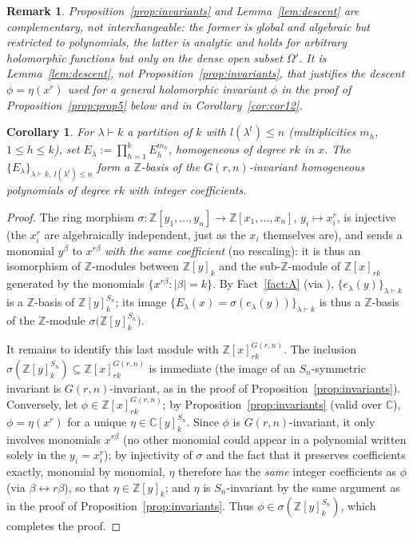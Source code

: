 \documentclass[10pt,a4paper]{amsart}
\newtheorem{corollary}[theorem]{Corollary}
\newtheorem{remark}[theorem]{Remark}
\newcommand{\CC}{\mathbb{C}}
\newcommand{\ZZ}{\mathbb{Z}}
\begin{document}
\begin{remark}
Proposition~\ref{prop:invariants} and Lemma~\ref{lem:descent} are complementary, not interchangeable: the former is global and algebraic but restricted to polynomials, the latter is analytic and holds for arbitrary holomorphic functions but only on the dense open subset $\Omega'$. It is Lemma~\ref{lem:descent}, not Proposition~\ref{prop:invariants}, that justifies the descent $\phi=\eta(x^r)$ used for a general holomorphic invariant $\phi$ in the proof of Proposition~\ref{prop:prop5} below and in Corollary~\ref{cor:cor12}.
\end{remark}

\begin{corollary}\label{cor:base}
For $\lambda\vdash k$ a partition of $k$ with $l(\lambda^t)\le n$ (multiplicities $m_h$, $1\le h\le k$), set $E_\lambda:=\prod_{h=1}^k E_h^{m_h}$, homogeneous of degree $rk$ in $x$. The $\{E_\lambda\}_{\lambda\vdash k,\ l(\lambda^t)\le n}$ form a $\ZZ$-basis of the $G(r,n)$-invariant homogeneous polynomials of degree $rk$ with integer coefficients.
\end{corollary}

\begin{proof}
The ring morphism $\sigma:\ZZ[y_1,\dots,y_n]\to\ZZ[x_1,\dots,x_n]$, $y_i\mapsto x_i^r$, is injective (the $x_i^r$ are algebraically independent, just as the $x_i$ themselves are), and sends a monomial $y^\beta$ to $x^{r\beta}$ \emph{with the same coefficient} (no rescaling): it is thus an isomorphism of $\ZZ$-modules between $\ZZ[y]_k$ and the sub-$\ZZ$-module of $\ZZ[x]_{rk}$ generated by the monomials $\{x^{r\beta} : |\beta|=k\}$. By Fact~\ref{fact:A} (via \cite[Ch.~I]{Mac}), $\{e_\lambda(y)\}_{\lambda\vdash k}$ is a $\ZZ$-basis of $\ZZ[y]^{S_n}_k$; its image $\{E_\lambda(x)=\sigma(e_\lambda(y))\}_{\lambda\vdash k}$ is thus a $\ZZ$-basis of the $\ZZ$-module $\sigma\big(\ZZ[y]^{S_n}_k\big)$.

It remains to identify this last module with $\ZZ[x]^{G(r,n)}_{rk}$. The inclusion $\sigma(\ZZ[y]^{S_n}_k)\subseteq\ZZ[x]^{G(r,n)}_{rk}$ is immediate (the image of an $S_n$-symmetric invariant is $G(r,n)$-invariant, as in the proof of Proposition~\ref{prop:invariants}). Conversely, let $\phi\in\ZZ[x]^{G(r,n)}_{rk}$; by Proposition~\ref{prop:invariants} (valid over $\CC$), $\phi=\eta(x^r)$ for a unique $\eta\in\CC[y]^{S_n}_k$. Since $\phi$ is $G(r,n)$-invariant, it only involves monomials $x^{r\beta}$ (no other monomial could appear in a polynomial written solely in the $y_i=x_i^r$); by injectivity of $\sigma$ and the fact that it preserves coefficients exactly, monomial by monomial, $\eta$ therefore has the \emph{same} integer coefficients as $\phi$ (via $\beta\leftrightarrow r\beta$), so that $\eta\in\ZZ[y]_k$; and $\eta$ is $S_n$-invariant by the same argument as in the proof of Proposition~\ref{prop:invariants}. Thus $\phi\in\sigma(\ZZ[y]^{S_n}_k)$, which completes the proof.
\end{proof}
\end{document}
